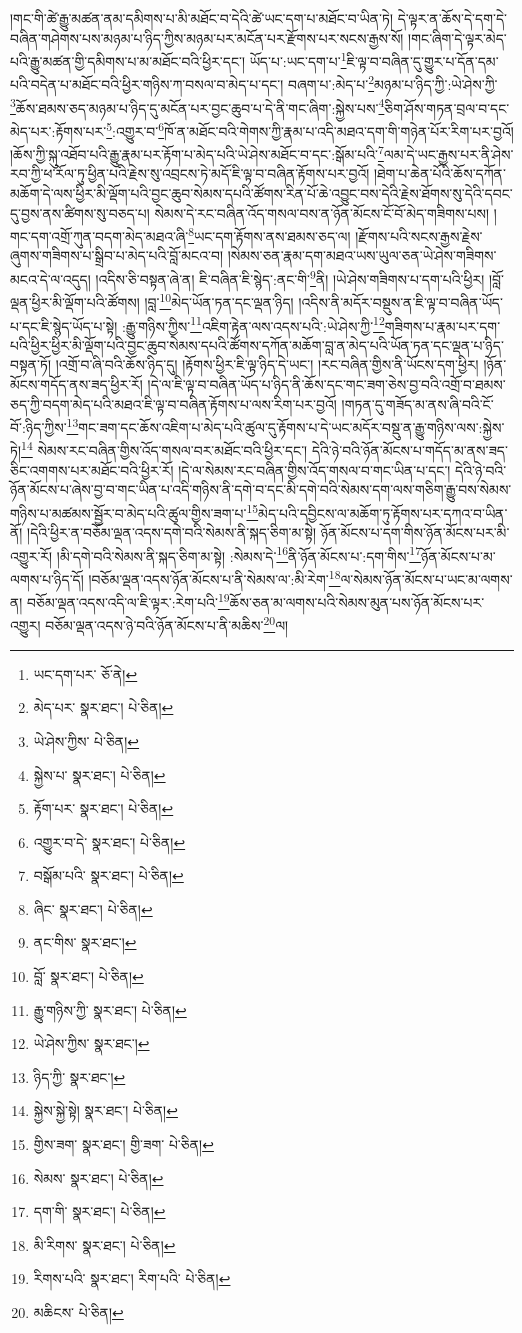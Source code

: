 །གང་གི་ཚེ་རྒྱུ་མཚན་ནམ་དམིགས་པ་མི་མཐོང་བ་དེའི་ཚེ་ཡང་དག་པ་མཐོང་བ་ཡིན་ཏེ། དེ་ལྟར་ན་ཆོས་དེ་དག་དེ་བཞིན་གཤེགས་པས་མཉམ་པ་ཉིད་ཀྱིས་མཉམ་པར་མངོན་པར་རྫོགས་པར་སངས་རྒྱས་སོ། །གང་ཞིག་དེ་ལྟར་མེད་པའི་རྒྱུ་མཚན་གྱི་དམིགས་པ་མ་མཐོང་བའི་ཕྱིར་དང་། ཡོད་པ་:ཡང་དག་པ་\footnote{ཡང་དག་པར་  ཅོ་ནེ། }ཇི་ལྟ་བ་བཞིན་དུ་གྱུར་པ་དོན་དམ་པའི་བདེན་པ་མཐོང་བའི་ཕྱིར་གཉིས་ཀ་བསལ་བ་མེད་པ་དང་། བཞག་པ་:མེད་པ་\footnote{མེད་པར་  སྣར་ཐང་།  པེ་ཅིན། }མཉམ་པ་ཉིད་ཀྱི་:ཡེ་ཤེས་ཀྱི་\footnote{ཡེ་ཤེས་ཀྱིས་  པེ་ཅིན། }ཆོས་ཐམས་ཅད་མཉམ་པ་ཉིད་དུ་མངོན་པར་བྱང་ཆུབ་པ་དེ་ནི་གང་ཞིག་:སྐྱེས་པས་\footnote{སྐྱེས་པ་  སྣར་ཐང་།  པེ་ཅིན། }ཅིག་ཤོས་གཏན་བྲལ་བ་དང་མེད་པར་:རྟོགས་པར་\footnote{རྟོག་པར་  སྣར་ཐང་།  པེ་ཅིན། }:འགྱུར་བ་\footnote{འགྱུར་བ་དེ་  སྣར་ཐང་།  པེ་ཅིན། }ཁོ་ན་མཐོང་བའི་གེགས་ཀྱི་རྣམ་པ་འདི་མཐའ་དག་གི་གཉེན་པོར་རིག་པར་བྱའོ། །ཆོས་ཀྱི་སྐུ་འཐོབ་པའི་རྒྱུ་རྣམ་པར་རྟོག་པ་མེད་པའི་ཡེ་ཤེས་མཐོང་བ་དང་:སྒོམ་པའི་\footnote{བསྒོམ་པའི་  སྣར་ཐང་།  པེ་ཅིན། }ལམ་དེ་ཡང་རྒྱས་པར་ནི་ཤེས་རབ་ཀྱི་ཕ་རོལ་ཏུ་ཕྱིན་པའི་རྗེས་སུ་འབྲངས་ཏེ་མདོ་ཇི་ལྟ་བ་བཞིན་རྟོགས་པར་བྱའོ། །ཐེག་པ་ཆེན་པོའི་ཆོས་དཀོན་མཆོག་དེ་ལས་ཕྱིར་མི་ལྡོག་པའི་བྱང་ཆུབ་སེམས་དཔའི་ཚོགས་རིན་པོ་ཆེ་འབྱུང་བས་དེའི་རྗེས་ཐོགས་སུ་དེའི་དབང་དུ་བྱས་ནས་ཚིགས་སུ་བཅད་པ། སེམས་དེ་རང་བཞིན་འོད་གསལ་བས་ན་ཉོན་མོངས་ངོ་བོ་མེད་གཟིགས་པས། །གང་དག་འགྲོ་ཀུན་བདག་མེད་མཐའ་ཞི་\footnote{ཞིང་  སྣར་ཐང་།  པེ་ཅིན། }ཡང་དག་རྟོགས་ནས་ཐམས་ཅད་ལ། །རྫོགས་པའི་སངས་རྒྱས་རྗེས་ཞུགས་གཟིགས་པ་སྒྲིབ་པ་མེད་པའི་བློ་མངའ་བ། །སེམས་ཅན་རྣམ་དག་མཐའ་ཡས་ཡུལ་ཅན་ཡེ་ཤེས་གཟིགས་མངའ་དེ་ལ་འདུད། །འདིས་ཅི་བསྟན་ཞེ་ན། ཇི་བཞིན་ཇི་སྙེད་:ནང་གི་\footnote{ནང་གིས་  སྣར་ཐང་། }ནི། །ཡེ་ཤེས་གཟིགས་པ་དག་པའི་ཕྱིར། །བློ་ལྡན་ཕྱིར་མི་ལྡོག་པའི་ཚོགས། །བླ་\footnote{བློ་  སྣར་ཐང་།  པེ་ཅིན། }མེད་ཡོན་ཏན་དང་ལྡན་ཉིད། །འདིས་ནི་མདོར་བསྡུས་ན་ཇི་ལྟ་བ་བཞིན་ཡོད་པ་དང་ཇི་སྙེད་ཡོད་པ་སྟེ། :རྒྱུ་གཉིས་ཀྱིས་\footnote{རྒྱུ་གཉིས་ཀྱི་  སྣར་ཐང་།  པེ་ཅིན། }འཇིག་རྟེན་ལས་འདས་པའི་:ཡེ་ཤེས་ཀྱི་\footnote{ཡེ་ཤེས་ཀྱིས་  སྣར་ཐང་། }གཟིགས་པ་རྣམ་པར་དག་པའི་ཕྱིར་ཕྱིར་མི་ལྡོག་པའི་བྱང་ཆུབ་སེམས་དཔའི་ཚོགས་དཀོན་མཆོག་བླ་ན་མེད་པའི་ཡོན་ཏན་དང་ལྡན་པ་ཉིད་བསྟན་ཏོ། །འགྲོ་བ་ཞི་བའི་ཆོས་ཉིད་དུ། །རྟོགས་ཕྱིར་ཇི་ལྟ་ཉིད་དེ་ཡང་། །རང་བཞིན་གྱིས་ནི་ཡོངས་དག་ཕྱིར། །ཉོན་མོངས་གདོད་ནས་ཟད་ཕྱིར་རོ། །དེ་ལ་ཇི་ལྟ་བ་བཞིན་ཡོད་པ་ཉིད་ནི་ཆོས་དང་གང་ཟག་ཅེས་བྱ་བའི་འགྲོ་བ་ཐམས་ཅད་ཀྱི་བདག་མེད་པའི་མཐའ་ཇི་ལྟ་བ་བཞིན་རྟོགས་པ་ལས་རིག་པར་བྱའོ། །གཏན་དུ་གཟོད་མ་ནས་ཞི་བའི་ངོ་བོ་:ཉིད་ཀྱིས་\footnote{ཉིད་ཀྱི་  སྣར་ཐང་། }གང་ཟག་དང་ཆོས་འཇིག་པ་མེད་པའི་ཚུལ་དུ་རྟོགས་པ་དེ་ཡང་མདོར་བསྡུ་ན་རྒྱུ་གཉིས་ལས་:སྐྱེས་ཏེ།\footnote{སྐྱེས་སྐྱེ་སྟེ།  སྣར་ཐང་།  པེ་ཅིན། } སེམས་རང་བཞིན་གྱིས་འོད་གསལ་བར་མཐོང་བའི་ཕྱིར་དང་། དེའི་ཉེ་བའི་ཉོན་མོངས་པ་གདོད་མ་ནས་ཟད་ཅིང་འགགས་པར་མཐོང་བའི་ཕྱིར་རོ། །དེ་ལ་སེམས་རང་བཞིན་གྱིས་འོད་གསལ་བ་གང་ཡིན་པ་དང་། དེའི་ཉེ་བའི་ཉོན་མོངས་པ་ཞེས་བྱ་བ་གང་ཡིན་པ་འདི་གཉིས་ནི་དགེ་བ་དང་མི་དགེ་བའི་སེམས་དག་ལས་གཅིག་རྒྱུ་བས་སེམས་གཉིས་པ་མཚམས་སྦྱོར་བ་མེད་པའི་ཚུལ་གྱིས་ཟག་པ་\footnote{གྱིས་ཟག་  སྣར་ཐང་། གྱི་ཟག་  པེ་ཅིན། }མེད་པའི་དབྱིངས་ལ་མཆོག་ཏུ་རྟོགས་པར་དཀའ་བ་ཡིན་ནོ། །དེའི་ཕྱིར་ན་བཅོམ་ལྡན་འདས་དགེ་བའི་སེམས་ནི་སྐད་ཅིག་མ་སྟེ། ཉོན་མོངས་པ་དག་གིས་ཉོན་མོངས་པར་མི་འགྱུར་རོ། །མི་དགེ་བའི་སེམས་ནི་སྐད་ཅིག་མ་སྟེ། :སེམས་དེ་\footnote{སེམས་  སྣར་ཐང་།  པེ་ཅིན། }ནི་ཉོན་མོངས་པ་:དག་གིས་\footnote{དག་གི་  སྣར་ཐང་།  པེ་ཅིན། }ཉོན་མོངས་པ་མ་ལགས་པ་ཉིད་དོ། །བཅོམ་ལྡན་འདས་ཉོན་མོངས་པ་ནི་སེམས་ལ་:མི་རེག་\footnote{མི་རིགས་  སྣར་ཐང་།  པེ་ཅིན། }ལ་སེམས་ཉོན་མོངས་པ་ཡང་མ་ལགས་ན། བཅོམ་ལྡན་འདས་འདི་ལ་ཇི་ལྟར་:རེག་པའི་\footnote{རིགས་པའི་  སྣར་ཐང་། རིག་པའི་  པེ་ཅིན། }ཆོས་ཅན་མ་ལགས་པའི་སེམས་མུན་པས་ཉོན་མོངས་པར་འགྱུར། བཅོམ་ལྡན་འདས་ཉེ་བའི་ཉོན་མོངས་པ་ནི་མཆིས་\footnote{མཆིངས་  པེ་ཅིན། }ལ། 
